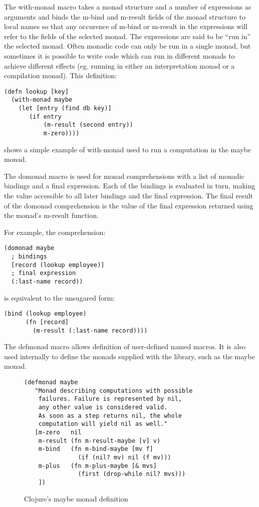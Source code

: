 \documentclass[natbib,10pt]{sigplanconf}
\begin{document}
The {\mono with-monad} macro takes a monad structure and a number of
expressions as arguments and binds the {\mono m-bind} and {\mono
  m-result} fields of the monad structure to local names so that any
occurence of {\mono m-bind} or {\mono m-result} in the expressions
will refer to the fields of the selected monad.  The expressions are
said to be ``run in'' the selected monad.  Often monadic code can only
be run in a single monad, but sometimes it is possible to write code
which can run in different monads to achieve different effects
(eg. running in either an interpretation monad or a compilation
monad).  This definition:
\begin{verbatim}
(defn lookup [key]
  (with-monad maybe
    (let [entry (find db key)]
       (if entry
           (m-result (second entry))
           m-zero))))
\end{verbatim}
shows a simple example of {\mono with-monad} used to run a computation
in the {\mono maybe} monad.

The {\mono domonad} macro is used for monad comprehensions with a list
of monadic bindings and a final expression.  Each of the bindings is
evaluated in turn, making the value accessible to all later bindings
and the final expression.  The final result of the {\mono domonad}
comprehension is the value of the final expression returned using
the monad's {\mono m-result} function.

For example, the comprehension:
\begin{verbatim}
(domonad maybe
  ; bindings
  [record (lookup employee)]
  ; final expression
  (:last-name record))
\end{verbatim}
is equivalent to the unsugared form:
\begin{verbatim}
(bind (lookup employee)
      (fn [record]
        (m-result (:last-name record))))
\end{verbatim}

The {\mono defmonad} macro allows definition of user-defined named
macros.  It is also used internally to define the monads supplied
with the library, such as the {\mono maybe} monad.

\begin{figure}
\begin{center}
\begin{verbatim}
(defmonad maybe
   "Monad describing computations with possible
    failures. Failure is represented by nil,
    any other value is considered valid.
    As soon as a step returns nil, the whole
    computation will yield nil as well."
   [m-zero   nil
    m-result (fn m-result-maybe [v] v)
    m-bind   (fn m-bind-maybe [mv f]
               (if (nil? mv) nil (f mv)))
    m-plus   (fn m-plus-maybe [& mvs]
               (first (drop-while nil? mvs)))
    ])

\end{verbatim}
\end{center}
\caption{Clojure's maybe monad definition}
\label{fig-Clojure-maybe-defn}
\end{figure}
\end{document}
